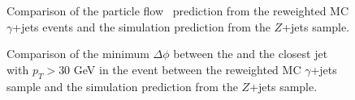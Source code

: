 \begin{figure}[!htbp]
\begin{center}
\caption{Comparison of the particle flow \met\  prediction from the reweighted MC $\gamma$+jets 
events and the simulation prediction from the $Z$+jets sample. }
\label{fig:PhotonJetsClosureTest}
\end{center}
\end{figure}

\begin{figure}[!htbp]
\begin{center}
\caption{Comparison of the minimum $\Delta\phi$ between the \met and the closest jet with $p_{T}>30$ GeV
in the event between the reweighted MC $\gamma$+jets sample and the 
simulation prediction from the $Z$+jets sample.}
\label{fig:PhotonJetsClosureTest_DPhi}
\end{center}
\end{figure}


